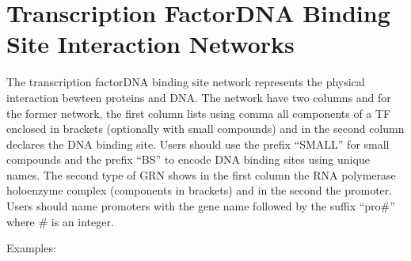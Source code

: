 \documentclass[letterpaper,10pt,english]{sphinxmanual}
\begin{document}
\section{Transcription Factor\sphinxhyphen{}DNA Binding Site Interaction Networks}
\label{\detokenize{NetTFsDNABindingSites:transcription-factor-dna-binding-site-interaction-networks}}\label{\detokenize{NetTFsDNABindingSites:net-tfsdnabindingsites}}\label{\detokenize{NetTFsDNABindingSites::doc}}
The transcription factor\sphinxhyphen{}DNA binding site network represents the physical
interaction bewteen proteins and DNA. The network have two columns and for the
former network, the first column lists using comma all components of a TF
enclosed in brackets (optionally with small compounds) and in the second column
declares the DNA binding site. Users should use the prefix “SMALL\sphinxhyphen{}” for small
compounds and the prefix “BS\sphinxhyphen{}” to encode DNA binding sites using unique names.
The second type of GRN shows in the first column the RNA polymerase holoenzyme
complex (components in brackets) and in the second the promoter. Users should
name promoters with the gene name followed by the suffix “\sphinxhyphen{}pro\#” where \# is an
integer.

Examples:
\end{document}
